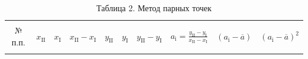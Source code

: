 \begin{center}
\begin{table}[H]
\centering
\caption*{Таблица 2. Метод парных точек}
\label{tabl:3}
\begin{tabular}{|c|c|c|c|c|c|c|c|c|c|}
\hline
\begin{minipage}{7mm}
    № п.п. 
\end{minipage}&
\begin{minipage}{7mm}
   \begin{center} $x_{\text{II}}$ \end{center} 
\end{minipage} &
\begin{minipage}{7mm}
   \begin{center} $x_{\text{I}}$ \end{center} 
\end{minipage} &
\begin{minipage}{14mm}
   \begin{center} $x_{\text{II}}-x_{\text{I}}$ \end{center} 
\end{minipage}&
\begin{minipage}{7mm}
   \begin{center} $y_{\text{II}}$ \end{center} 
\end{minipage}&
\begin{minipage}{7mm}
   \begin{center} $y_{\text{I}}$ \end{center} 
\end{minipage}&
\begin{minipage}{14mm}
   \begin{center} $y_{\text{II}}-y_{\text{I}}$ \end{center} 
\end{minipage}&
\begin{minipage}{25mm}
   \begin{center} $a_{\text{i}}=\frac{y_{\text{II}}-y_{\text{I}}}{x_{\text{II}}-x_{\text{I}}}$ \end{center} 
\end{minipage}&
\begin{minipage}{20mm}
     \begin{center} $(a_{\text{i}}-\overline{a})$ \end{center}
\end{minipage}&
\begin{minipage}{20mm}
     \begin{center} $(a_{\text{i}}-\overline{a})^2$ \end{center}

\end{minipage}
\end{tabular}
\end{table}
\end{center}
